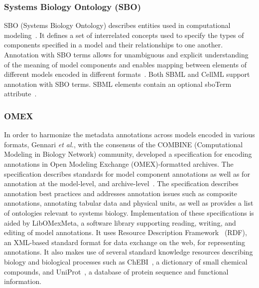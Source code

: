 \documentclass[12pt]{report}
\begin{document}
\subsubsection{Systems Biology Ontology (SBO)}
SBO (Systems Biology Ontology) describes entities used in computational modeling~\cite{SBO, Curtout2011}. It defines a set of interrelated concepts used to specify the types of components specified in a model and their relationships to one another. Annotation with SBO terms allows for unambiguous and explicit understanding of the meaning of model components and enables mapping between elements of different models encoded in different formats~\cite{Curtout2011}. Both SBML and CellML support annotation with SBO terms.  SBML elements contain an optional sboTerm attribute~\cite{Curtout2011, Hucka2015, Wimalaratne2009}. 


\subsubsection{OMEX}
In order to harmonize the metadata annotations across models encoded in various formats, Gennari \textit{et al.}, with the consensus of the COMBINE (Computational Modeling in Biology Network) community, developed a specification for encoding annotations in Open Modeling Exchange (OMEX)-formatted archives. The specification describes standards for model component annotations as well as for annotation at the model-level, and archive-level~\cite{Gennari2021}. The specification describes annotation best practices and addresses annotation issues such as composite annotations, annotating tabular data and physical units, as well as provides a list of ontologies relevant to systems biology. Implementation of these specifications is aided by LibOMexMeta, a software library supporting reading, writing, and editing of model annotations. It uses Resource Description Framework~\cite{Decker2000} (RDF), an XML-based standard format for data exchange on the web, for representing annotations. It also makes use of several standard knowledge resources describing biology and biological processes such as ChEBI~\cite{Hastings2015}, a dictionary of small chemical compounds, and UniProt~\cite{Apweiler2004}, a database of protein sequence and functional information.
\end{document}
